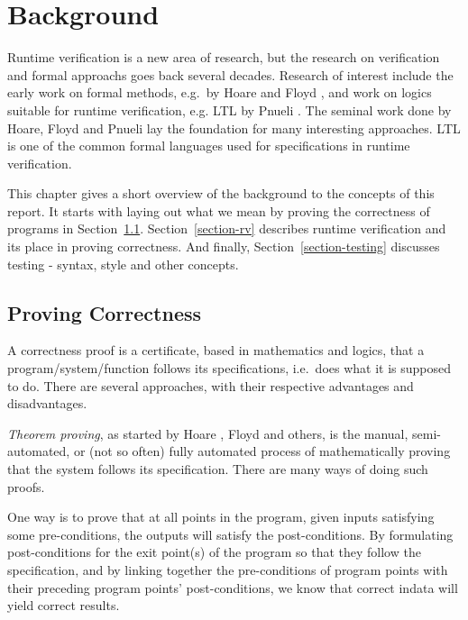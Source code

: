 \documentclass[a4paper,11pt]{kth-mag}
\begin{document}
\pagestyle{newchap}
\chapter{Background} \label{chapter-background}

Runtime verification is a new area of research, but the research on
verification and formal approachs goes back several decades. Research of interest
include the early work on formal methods, e.g.\ by Hoare \cite{hoare69} and
Floyd \cite{floyd67}, and work on logics suitable for runtime verification,
e.g. LTL by Pnueli \cite{pnueli77}. The seminal work done by Hoare, Floyd and
Pnueli lay the foundation for many interesting approaches. LTL is one of the
common formal languages used for specifications in runtime verification.

This chapter gives a short overview of the background to the concepts of this
report. It starts with laying out what we mean by proving the correctness of
programs in Section~\ref{section-proving-correctness}. Section~\ref{section-rv}
describes runtime verification and its place in proving correctness. And
finally, Section~\ref{section-testing} discusses testing - syntax, style and
other concepts.


\section{Proving Correctness} \label{section-proving-correctness}

A correctness proof is a certificate, based in mathematics and logics, that a
program/system/function follows its specifications, i.e.\ does what it is
supposed to do. There are several approaches, with their respective advantages
and disadvantages.

\textit{Theorem proving}, as started by Hoare \cite{hoare69}, Floyd
\cite{floyd67} and others, is the manual, semi-automated, or (not so often)
fully automated process of mathematically proving that the system follows its
specification. There are many ways of doing such proofs.

One way is to prove that at all points in the program, given inputs satisfying
some pre-conditions, the outputs will satisfy the post-conditions. By
formulating post-conditions for the exit point(s) of the program so that they
follow the specification, and by linking together the pre-conditions of program
points with their preceding program points' post-conditions, we know that
correct indata will yield correct results.
\end{document}
